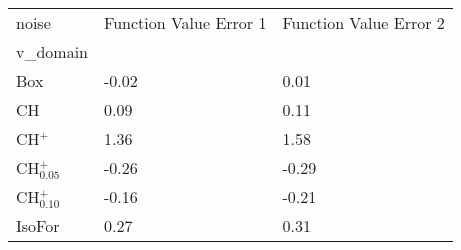 \begin{tabular}{lll}
\toprule
noise & Function Value Error 1 & Function Value Error 2 \\
v_domain &  &  \\
\midrule
Box & -0.02 & 0.01 \\
CH & 0.09 & 0.11 \\
CH$^+$ & 1.36 & 1.58 \\
CH$^+_{0.05}$ & -0.26 & -0.29 \\
CH$^+_{0.10}$ & -0.16 & -0.21 \\
IsoFor & 0.27 & 0.31 \\
\bottomrule
\end{tabular}
